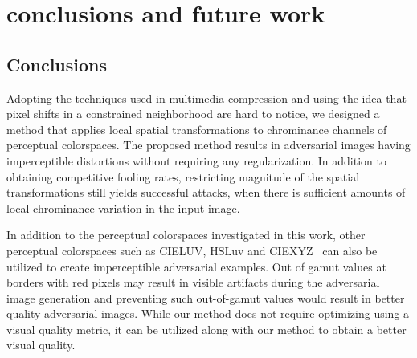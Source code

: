 \chapter{conclusions and future work}
\label{chp:6_conclusion}
\section{Conclusions}
Adopting the techniques used in multimedia compression and using the idea that pixel shifts in a constrained neighborhood are hard to notice, we designed a method that applies local spatial transformations to chrominance channels of perceptual colorspaces. The proposed method results in adversarial images having imperceptible distortions without requiring any regularization. In addition to obtaining competitive fooling rates, restricting magnitude of the spatial transformations still yields successful attacks, when there is sufficient amounts of local chrominance variation in the input image.

In addition to the perceptual colorspaces investigated in this work, other perceptual colorspaces such as CIELUV, HSLuv and CIEXYZ~\cite{schanda2007colorimetry} can also be utilized to create imperceptible adversarial examples. Out of gamut values at borders with red pixels may result in visible artifacts during the adversarial image generation and preventing such out-of-gamut values would result in better quality adversarial images.  %
While our method does not require optimizing using a visual quality metric, it can be utilized along with our method to obtain a better visual quality.
